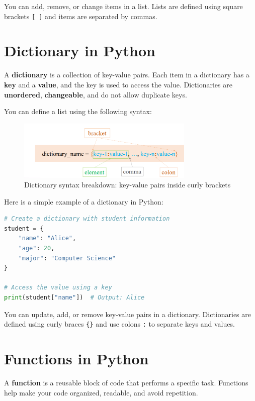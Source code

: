 \documentclass{article}
\begin{document}
You can add, remove, or change items in a list.  
Lists are defined using square brackets \texttt{[ ]} and items are separated by commas.

\section{Dictionary in Python}

A \textbf{dictionary} is a collection of key-value pairs.  
Each item in a dictionary has a \textbf{key} and a \textbf{value}, and the key is used to access the value.  
Dictionaries are \textbf{unordered}, \textbf{changeable}, and do not allow duplicate keys.

You can define a list using the following syntax:
\begin{figure}[H]
    \centering
    \includegraphics[width=0.75\textwidth]{dictionary_syntax.png}
    \caption{Dictionary syntax breakdown: key-value pairs inside curly brackets}
\end{figure}

Here is a simple example of a dictionary in Python:

\begin{lstlisting}[language=Python]
# Create a dictionary with student information
student = {
    "name": "Alice",
    "age": 20,
    "major": "Computer Science"
}

# Access the value using a key
print(student["name"])  # Output: Alice
\end{lstlisting}

You can update, add, or remove key-value pairs in a dictionary.  
Dictionaries are defined using curly braces \texttt{\{\}} and use colons \texttt{:} to separate keys and values.
\section{Functions in Python}

A \textbf{function} is a reusable block of code that performs a specific task.  
Functions help make your code organized, readable, and avoid repetition.
\end{document}
